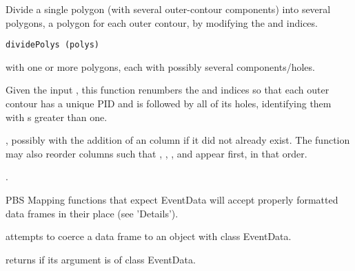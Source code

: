 \documentclass[letterpaper]{book}
\begin{document}
%
\begin{Description}\relax
Divide a single polygon (with several outer-contour components) into
several polygons, a polygon for each outer contour, by modifying the
 and  indices.
\end{Description}
%
\begin{Usage}
\begin{verbatim}
dividePolys (polys)
\end{verbatim}
\end{Usage}
%
\begin{Arguments}
\begin{ldescription}
\item[\code{polys}]  with one or more polygons, each with
possibly several components/holes.
\end{ldescription}
\end{Arguments}
%
\begin{Details}\relax
Given the input , this function renumbers the 
and  indices so that each outer contour has a unique PID and
is followed by all of its holes, identifying them with s
greater than one.
\end{Details}
%
\begin{Value}
, possibly with the addition of an  column if
it did not already exist.  The function may also reorder columns such
that , , ,  and  appear
first, in that order.
\end{Value}
%
\begin{SeeAlso}\relax
{}.
\end{SeeAlso}
%
\begin{Description}\relax
PBS Mapping functions that expect EventData will accept properly
formatted data frames in their place (see 'Details').

 attempts to coerce a data frame to an object with
class EventData.

 returns  if its argument is of class
EventData.
\end{Description}
\end{document}
